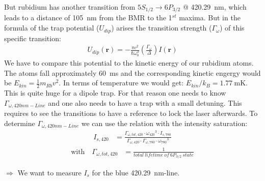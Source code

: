 But rubidium has another transition from \(5S_{1/2} \rightarrow 6P_{3/2}\) @
\SI{420.29}{\nano\meter}, which leads to a distance of \SI{105}{\nano\meter} from
the BMR to the 1\(^{st}\) maxima. But in the formula \citep{grimm} of the trap potential (\(U_{dip}\))
arises the transition strength (\(\Gamma_\omega \)) of this specific transition:
\bigskip
\begin{align}
    U_{dip}(\mathbf{r})=-\frac{\pi c^2}{\hbar\omega_0^3} \left( \frac{\Gamma_\omega}{\Delta} \right) I(\mathbf{r})
\end{align}
\bigskip
We have to compare this potential to the kinetic energy of our rubidium atoms. The atoms fall approximately
\SI{60}{\milli\second} and the corresponding kinetic engergy would be \(E_{kin} = \frac{1}{2} m_{Rb} v^2\).
In terms of temperature we would get: \(E_{kin} / k_B = \SI{1.77}{\milli\kelvin} \). This is quite huge
for a dipole trap. For that reason one needs to know \(\Gamma_{\omega,420nm-Line} \) and one also needs to have a trap
with a small detuning. This requires to see the transitions to have a reference to lock the laser afterwards.
\bigskip
To determine \(\Gamma_{\omega,420nm-Line} \) we can use the relation with the intensity saturation:
\begin{align}
    I_{s,420} &= \frac{\Gamma_{\omega,tot,420}\cdot{\omega_{420}}^3\cdot I_{s,780}}{\Gamma_{\omega,420}\cdot\Gamma_{\omega,780}\cdot{\omega_{780}}^3}
\end{align}
\begin{align*}
    \text{with~~~} \Gamma_{\omega,tot,420} &= \frac{1}{total~lifetime~of~6P_{3/2}~state}
\end{align*}
\medskip

\(\Rightarrow \) We want to measure \(I_{s}\) for the blue \SI{420.29}{\nano\meter}-line. 

